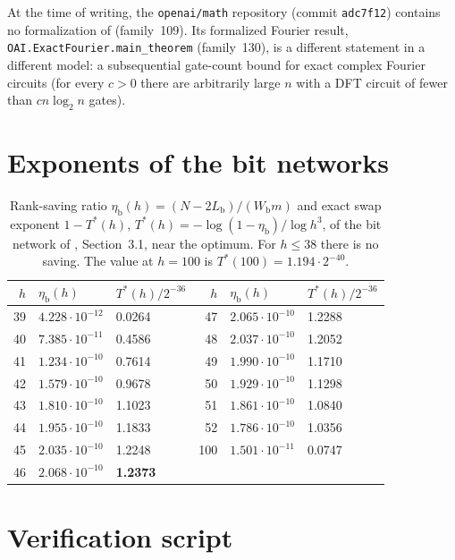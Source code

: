 \documentclass[11pt]{article}
\numberwithin{equation}{section}
\numberwithin{table}{section}
\theoremstyle{remark}
\newcommand{\OAI}{\cite{OAI}}
\newcommand{\Wb}{W_{\mathrm b}}
\newcommand{\Lb}{L_{\mathrm b}}
\newcommand{\etab}{\eta_{\mathrm b}}
\newcommand{\lean}[1]{\texttt{#1}}
\begin{document}
At the time of writing, the \texttt{openai/math} repository
(commit \texttt{adc7f12}) contains no formalization of \OAI{}
(family~109). Its formalized Fourier result,
\lean{OAI.ExactFourier.main\_theorem} (family~130), is a different
statement in a different model: a subsequential gate-count bound for
exact complex Fourier circuits (for every $c>0$ there are arbitrarily
large $n$ with a DFT circuit of fewer than $cn\log_2n$ gates).

\appendix

\section{Exponents of the bit networks}\label{app:h}

\begin{table}[H]
\centering
\small
\begin{tabular}{@{}rll@{\qquad}rll@{}}
\toprule
$h$ & $\etab(h)$ & $T^*(h)/2^{-36}$ & $h$ & $\etab(h)$ & $T^*(h)/2^{-36}$\\
\midrule
39 & $4.228\cdot10^{-12}$ & 0.0264 & 47 & $2.065\cdot10^{-10}$ & 1.2288\\
40 & $7.385\cdot10^{-11}$ & 0.4586 & 48 & $2.037\cdot10^{-10}$ & 1.2052\\
41 & $1.234\cdot10^{-10}$ & 0.7614 & 49 & $1.990\cdot10^{-10}$ & 1.1710\\
42 & $1.579\cdot10^{-10}$ & 0.9678 & 50 & $1.929\cdot10^{-10}$ & 1.1298\\
43 & $1.810\cdot10^{-10}$ & 1.1023 & 51 & $1.861\cdot10^{-10}$ & 1.0840\\
44 & $1.955\cdot10^{-10}$ & 1.1833 & 52 & $1.786\cdot10^{-10}$ & 1.0356\\
45 & $2.035\cdot10^{-10}$ & 1.2248 & 100 & $1.501\cdot10^{-11}$ & 0.0747\\
46 & $2.068\cdot10^{-10}$ & \textbf{1.2373} & & &\\
\bottomrule
\end{tabular}
\caption{Rank-saving ratio $\etab(h)=(N-2\Lb)/(\Wb m)$ and exact swap
exponent $1-T^*(h)$, $T^*(h)=-\log(1-\etab)/\log h^3$, of the bit
network of \OAI, Section~3.1, near the optimum. For $h\le38$ there is no
saving. The value at $h=100$ is $T^*(100)=1.194\cdot2^{-40}$.}
\label{tab:h}
\end{table}

\section{Verification script}\label{app:script}
\end{document}

